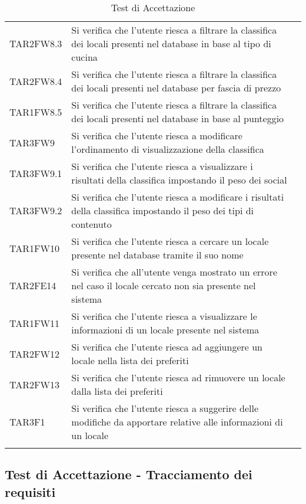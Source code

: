 \begin{longtable}{ m{}<{\centering}  m{}<{\centering}  m{}<{\centering} }
	TAR2FW8.3 & Si verifica che l'utente riesca a filtrare la classifica dei locali presenti nel database in base al tipo di cucina & \Ni \\
	TAR2FW8.4 & Si verifica che l'utente riesca a filtrare la classifica dei locali presenti nel database per fascia di prezzo & \Ni \\
	TAR1FW8.5 & Si verifica che l'utente riesca a filtrare la classifica dei locali presenti nel database in base al punteggio & \Ni \\
	TAR3FW9 & Si verifica che l'utente riesca a modificare l'ordinamento di visualizzazione della classifica & \Ni \\
	TAR3FW9.1 & Si verifica che l'utente riesca a visualizzare i risultati della classifica impostando il peso dei social & \Ni \\
	TAR3FW9.2 & Si verifica che l'utente riesca a modificare i risultati della classifica impostando il peso dei tipi di contenuto & \Ni \\
	TAR1FW10 & Si verifica che l'utente riesca a cercare un locale presente nel database tramite il suo nome & \Ni \\
	TAR2FE14 & Si verifica che all'utente venga mostrato un errore nel caso il locale cercato non sia presente nel sistema & \Ni \\
	TAR1FW11 & Si verifica che l'utente riesca a visualizzare le informazioni di un locale presente nel sistema & \Ni \\
	TAR2FW12 & Si verifica che l'utente riesca ad aggiungere un locale nella lista dei preferiti & \Ni \\
	TAR2FW13 & Si verifica che l'utente riesca ad rimuovere un locale dalla lista dei preferiti & \Ni \\
	TAR3F1 & Si verifica che l'utente riesca a suggerire delle modifiche da apportare relative alle informazioni di un locale & \Ni \\
	
    \caption{Test di Accettazione}
\end{longtable}	

\subsection{Test di Accettazione - Tracciamento dei requisiti}


